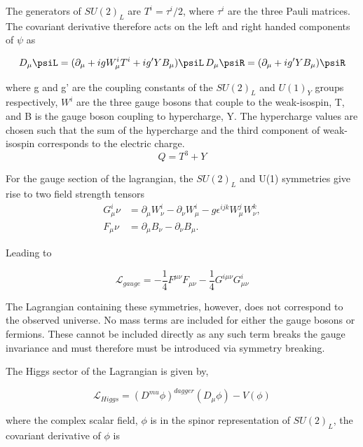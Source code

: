 The generators of $SU(2)_L$ are $T^i = \tau^i/2$, where $\tau^i$ are the three Pauli matrices. 
The covariant derivative therefore acts on the left and right handed components of $\psi$ as

\begin{equation}
D_{\mu} \psiL = (\partial_\mu + igW^i_{\mu}T^i + ig'YB_\mu)\psiL \, D_{\mu} \psiR = (\partial_\mu + ig'YB_\mu)\psiR
\end{equation}

where g and g' are the coupling constants of the $SU(2)_L$ and $U(1)_Y$ groups respectively, 
$W^i$ are the three gauge bosons that couple to the weak-isospin, T, and B is the gauge boson
coupling to hypercharge, Y. The hypercharge values are chosen such that the sum of the hypercharge and 
the third component of weak-isospin corresponds to the electric charge.
\begin{equation}
\label{equ:charge}
Q = T^{3} + Y
\end{equation}

For the gauge section of the lagrangian, the $SU(2)_L$ and U(1) symmetries give rise to two field strength tensors
\begin{align}
G^i_\mu\nu &= \partial_\mu W^i_\nu - \partial_\nu W^i_\mu - g \epsilon^{ijk}W^j_\mu W^k_\nu,\\
F_\mu\nu &= \partial_\mu B_\nu - \partial_\nu B_\mu.
\end{align}

Leading to

\begin{equation}
\mathcal{L}_{gauge} = -\frac{1}{4}F^{\mu\nu}F_{\mu\nu} - \frac{1}{4}G^{i\mu\nu}G^{i}_{\mu\nu}
\end{equation}

The Lagrangian containing these symmetries, however, does not correspond to the observed universe. No mass terms
are included for either the gauge bosons or fermions. These cannot be included directly as any such term breaks 
the gauge invariance and must therefore must be introduced via symmetry breaking.

The Higgs sector of the Lagrangian is given by,

\begin{equation}
\label{equ:higgs-lagrangian}
\mathcal{L}_{Higgs} = (D^{mu}\phi)^{dagger}(D_{\mu}\phi) - V(\phi)
\end{equation}

where the complex scalar field, $\phi$ is in the spinor representation of $SU(2)_L$, the covariant derivative of $\phi$ is

